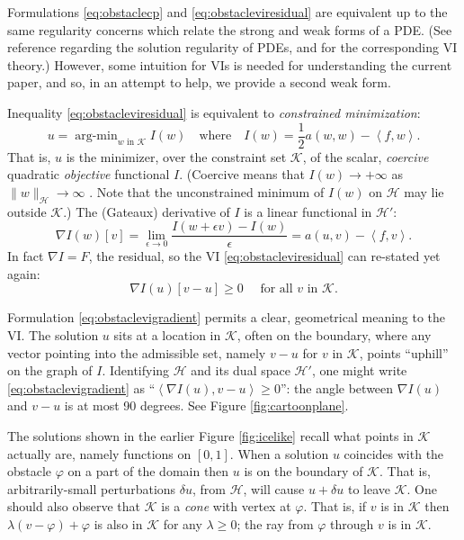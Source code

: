 \documentclass[letterpaper,final,12pt,reqno]{amsart}
\theoremstyle{claim}
\newcommand{\eps}{\epsilon}
\newcommand{\grad}{\nabla}
\newcommand{\ip}[2]{\left<#1,#2\right>}
\numberwithin{equation}{section}
\numberwithin{figure}{section}
\numberwithin{table}{section}
\numberwithin{theorem}{section}
\begin{document}
Formulations \eqref{eq:obstaclecp} and \eqref{eq:obstacleviresidual} are equivalent up to the same regularity concerns which relate the strong and weak forms of a PDE.  (See reference \cite{Evans2010} regarding the solution regularity of PDEs, and \cite{KinderlehrerStampacchia1980} for the corresponding VI theory.)  However, some intuition for VIs is needed for understanding the current paper, and so, in an attempt to help, we provide a second weak form.

Inequality \eqref{eq:obstacleviresidual} is equivalent to \emph{constrained minimization}:
\newcommand{\argmin}{\mathop{\mathrm{arg\text{-}min}}}
\begin{equation}
  u = \argmin_{w \text{ in } \mathcal{K}} I(w) \quad \text{where} \quad I(w) = \frac{1}{2} a(w,w) - \ip{f}{w}. \label{eq:obstaclemin}
\end{equation}
That is, $u$ is the minimizer, over the constraint set $\mathcal{K}$, of the scalar, \emph{coercive} quadratic \emph{objective} functional $I$.  (Coercive means that $I(w) \to +\infty$ as $\|w\|_{\mathcal{H}} \to \infty$ \cite{Evans2010}.  Note that the unconstrained minimum of $I(w)$ on $\mathcal{H}$ may lie outside $\mathcal{K}$.)  The (Gateaux) derivative of $I$ is a linear functional in $\mathcal{H}'$:
\begin{equation}
  \grad I(w)[v] = \lim_{\eps\to 0} \frac{I(w+\eps v) - I(w)}{\eps} = a(u,v) - \ip{f}{v}.  \label{eq:gradobjective}
\end{equation}
In fact $\nabla I = F$, the residual, so the VI \eqref{eq:obstacleviresidual} can re-stated yet again:
\begin{equation}
  \nabla I(u)[v-u] \ge 0 \quad \text{ for all } v \text{ in } \mathcal{K}. \label{eq:obstaclevigradient}
\end{equation}

Formulation \eqref{eq:obstaclevigradient} permits a clear, geometrical meaning to the VI.  The solution $u$ sits at a location in $\mathcal{K}$, often on the boundary, where any vector pointing into the admissible set, namely $v-u$ for $v$ in $\mathcal{K}$, points ``uphill'' on the graph of $I$.  Identifying $\mathcal{H}$ and its dual space $\mathcal{H}'$, one might write \eqref{eq:obstaclevigradient} as ``$\ip{\nabla I(u)}{v-u} \ge 0$'': the angle between $\nabla I(u)$ and $v-u$ is at most 90 degrees.  See Figure \ref{fig:cartoonplane}.

The solutions shown in the earlier Figure \ref{fig:icelike} recall what points in $\mathcal{K}$ actually are, namely functions on $[0,1]$.  When a solution $u$ coincides with the obstacle $\varphi$ on a part of the domain then $u$ is on the boundary of $\mathcal{K}$.  That is, arbitrarily-small perturbations $\delta u$, from $\mathcal{H}$, will cause $u+\delta u$ to leave $\mathcal{K}$.  One should also observe that $\mathcal{K}$ is a \emph{cone} with vertex at $\varphi$.  That is, if $v$ is in $\mathcal{K}$ then $\lambda(v-\varphi) + \varphi$ is also in $\mathcal{K}$ for any $\lambda \ge 0$; the ray from $\varphi$ through $v$ is in $\mathcal{K}$.
\end{document}
